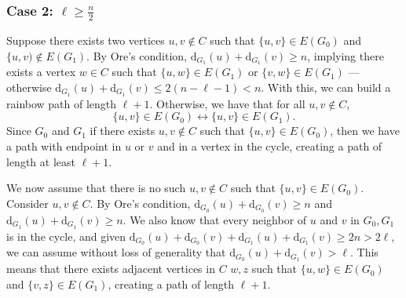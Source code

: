 \subsubsection{Case 2: \( \ell \geq \frac{n}{2} \)}

Suppose there exists two vertices \( u, v \not\in C \) such that \( \{u, v\} \in E(G_0) \) and \( \{u, v) \not\in E(G_1) \).
By Ore's condition, 
\( \text{d}_{G_1}(u) + \text{d}_{G_1}(v) \geq n \), 
implying there exists a vertex \( w \in C \) such that \( \{u, w\} \in E(G_1) \) or \( \{v, w\} \in E(G_1) \) 
--- otherwise \( \text{d}_{G_1}(u) + \text{d}_{G_1}(v) \leq 2 (n - \ell - 1) < n \).
With this, we can build a rainbow path of length \( \ell+1 \).
Otherwise, we have that for all \( u, v \not\in C \), 
\[ \{u, v\} \in E(G_0) \leftrightarrow \{u, v\} \in E(G_1). \]
Since \(G_0\) and \(G_1\) if there exists \(u, v \not\in C\) such that \( \{u, v\} \in E(G_0) \), 
then we have a path with endpoint in \(u\) or \(v\) and in a vertex in the cycle, creating a path of length at 
least \( \ell + 1 \).

We now assume that there is no such \(u, v \not \in C\) such that \( \{u, v\} \in E(G_0) \).
Consider \( u, v \not\in C \). By Ore's condition, 
\( \text{d}_{G_0}(u) + \text{d}_{G_0}(v) \geq n \) and \( \text{d}_{G_1}(u) + \text{d}_{G_1}(v) \geq n \). 
We also know that every neighbor of \(u\) and \(v\) in \(G_0, G_1\) is in the cycle, and
given \( \text{d}_{G_0}(u) + \text{d}_{G_0}(v) + \text{d}_{G_1}(u) + \text{d}_{G_1}(v) \geq 2n > 2\ell \), we 
can assume without loss of generality that \( \text{d}_{G_0}(u) + \text{d}_{G_1}(v) > \ell \).
This means that there exists adjacent vertices in \(C\) \(w, z\) such that
\( \{u, w\} \in E(G_0) \) and \( \{v, z\} \in E(G_1) \), creating a path of length \( \ell+1 \).